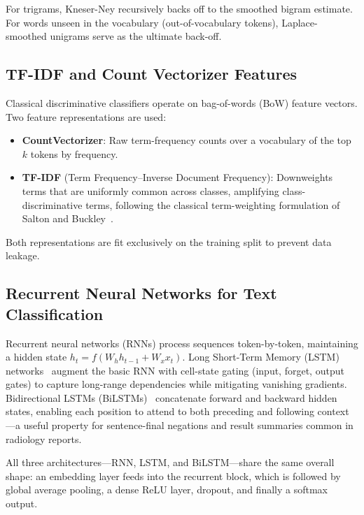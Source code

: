 \documentclass[11pt,a4paper]{article}
\begin{document}
For trigrams, Kneser-Ney recursively backs off to the smoothed bigram estimate.
For words unseen in the vocabulary (out-of-vocabulary tokens), Laplace-smoothed
unigrams serve as the ultimate back-off.

\subsection{TF-IDF and Count Vectorizer Features}

Classical discriminative classifiers operate on bag-of-words (BoW) feature
vectors.
Two feature representations are used:
\begin{itemize}
  \item \textbf{CountVectorizer}: Raw term-frequency counts over a
        vocabulary of the top $k$ tokens by frequency.
  \item \textbf{TF-IDF} (Term Frequency--Inverse Document Frequency):
        Downweights terms that are uniformly common across classes,
        amplifying class-discriminative terms, following the classical
        term-weighting formulation of Salton and Buckley~\cite{salton1988term}.
\end{itemize}

Both representations are fit exclusively on the training split to prevent
data leakage.

\subsection{Recurrent Neural Networks for Text Classification}

Recurrent neural networks (RNNs) process sequences token-by-token, maintaining
a hidden state $h_t = f(W_h h_{t-1} + W_x x_t)$.
Long Short-Term Memory (LSTM) networks~\cite{hochreiter1997long} augment the
basic RNN with cell-state gating (input, forget, output gates) to capture
long-range dependencies while mitigating vanishing gradients.
Bidirectional LSTMs (BiLSTMs)~\cite{schuster1997bidirectional} concatenate
forward and backward hidden states, enabling each position to attend to both
preceding and following context---a useful property for sentence-final negations
and result summaries common in radiology reports.

All three architectures---RNN, LSTM, and BiLSTM---share the same overall
shape: an embedding layer feeds into the recurrent block, which is followed
by global average pooling, a dense ReLU layer, dropout, and finally a softmax
output.

\end{document}
